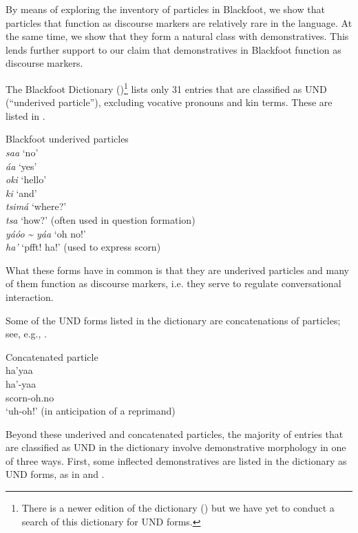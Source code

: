 \documentclass[output=paper,colorlinks,citecolor=brown]{langscibook}
\begin{document}
By means of exploring the inventory of particles in Blackfoot, we show that particles that function as discourse markers are relatively rare in the language. At the same time, we show that they form a natural class with demonstratives. This lends further support to our claim that demonstratives in Blackfoot function as discourse markers. 

The Blackfoot Dictionary (\citealt{FrantzRussell1995})\footnote{There is a newer edition of the dictionary (\citealt{FrantzRussell2017}) but we have yet to conduct a search of this dictionary for UND forms.}  lists only 31 entries that are classified as UND (“underived particle”), excluding vocative pronouns and kin terms. These are listed in .

\ea\label{ex:bliss:22} {Blackfoot underived particles}\\
\ea \textit{saa} ‘no’\\
\ex \textit{áa} ‘yes’\\
\ex \textit{oki} ‘hello’\\
\ex \textit{ki} ‘and’\\
\ex \textit{tsimá} ‘where?’\\
\ex \textit{tsa} ‘how?’ (often used in question formation)\\
\ex \textit{yáóo} \textit{{\textasciitilde} yáa} ‘oh no!’\\
\ex \textit{ha’} ‘pfft! ha!’ (used to express scorn)\\
\z
\z

What these forms have in common is that they are underived particles and many of them function as discourse markers, i.e. they serve to regulate conversational interaction.  

Some of the UND forms listed in the dictionary are concatenations of particles; see, e.g., .

\ea\label{ex:bliss:23} {Concatenated particle}\\
ha’yaa\\
\gll ha’-yaa\\
     scorn-oh.no\\
\glt ‘uh-oh!’ (in anticipation of a reprimand)
\z

Beyond these underived and concatenated particles, the majority of entries that are classified as UND in the dictionary involve demonstrative morphology in one of three ways. First, some inflected demonstratives are listed in the dictionary as UND forms, as in   and . 
\end{document}
